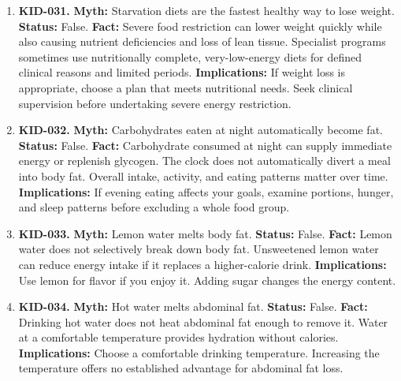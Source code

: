 \documentclass[11pt,oneside]{book}
\begin{document}
\begin{enumerate}[leftmargin=0pt,labelwidth=0pt,labelsep=0pt,itemindent=0pt]
\textbf{Implications:} Choose exercises for the movement or strength you want to improve. Changes in fat distribution vary between people.
\item[] \textbf{KID-031.} \textbf{Myth:} Starvation diets are the fastest healthy way to lose weight.\newline
\textbf{Status:} False.\newline
\textbf{Fact:} Severe food restriction can lower weight quickly while also causing nutrient deficiencies and loss of lean tissue. Specialist programs sometimes use nutritionally complete, very-low-energy diets for defined clinical reasons and limited periods. \cite{ref355}\newline
\textbf{Implications:} If weight loss is appropriate, choose a plan that meets nutritional needs. Seek clinical supervision before undertaking severe energy restriction.
\item[] \textbf{KID-032.} \textbf{Myth:} Carbohydrates eaten at night automatically become fat.\newline
\textbf{Status:} False.\newline
\textbf{Fact:} Carbohydrate consumed at night can supply immediate energy or replenish glycogen. The clock does not automatically divert a meal into body fat. Overall intake, activity, and eating patterns matter over time. \cite{ref191}\newline
\textbf{Implications:} If evening eating affects your goals, examine portions, hunger, and sleep patterns before excluding a whole food group.
\item[] \textbf{KID-033.} \textbf{Myth:} Lemon water melts body fat.\newline
\textbf{Status:} False.\newline
\textbf{Fact:} Lemon water does not selectively break down body fat. Unsweetened lemon water can reduce energy intake if it replaces a higher-calorie drink. \cite{ref191}\newline
\textbf{Implications:} Use lemon for flavor if you enjoy it. Adding sugar changes the energy content.
\item[] \textbf{KID-034.} \textbf{Myth:} Hot water melts abdominal fat.\newline
\textbf{Status:} False.\newline
\textbf{Fact:} Drinking hot water does not heat abdominal fat enough to remove it. Water at a comfortable temperature provides hydration without calories. \cite{ref191}\newline
\textbf{Implications:} Choose a comfortable drinking temperature. Increasing the temperature offers no established advantage for abdominal fat loss.

\end{enumerate}
\end{document}
